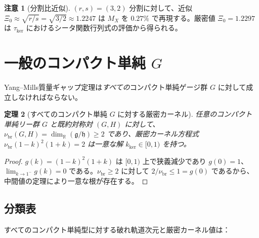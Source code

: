 \documentclass[12pt]{article}
\theoremstyle{plain}
\newtheorem{theorem}{定理}[section]
\theoremstyle{definition}
\newtheorem{remark}[theorem]{注意}
\numberwithin{equation}{section}
\newcommand{\R}{\mathbb{R}}
\newcommand{\fg}{\mathfrak{g}}
\newcommand{\fh}{\mathfrak{h}}
\newcommand{\br}{\mathrm{br}}
\newcommand{\kker}{\mathrm{ker}}
\begin{document}
\begin{remark}[分割比近似]
$(r,s)=(3,2)$ 分割に対して、近似 $\Xi_0\approx\sqrt{r/s}=\sqrt{3/2}\approx 1.2247$ は $M_X$ を $0.27\%$ で再現する。厳密値 $\Xi_0=1.2297$ は $\tau_{\kker}$ におけるシータ関数行列式の評価から得られる。
\end{remark}


\section{一般のコンパクト単純 $G$}\label{sec:generalG}

Yang--Mills質量ギャップ定理は\emph{すべての}コンパクト単純ゲージ群 $G$ に対して成立しなければならない。

\begin{theorem}[すべてのコンパクト単純 $G$ に対する厳密カーネル]\label{thm:generalkernel}
任意のコンパクト単純リー群 $G$ と既約対称対 $(G,H)$ に対して、$\nu_{\br}(G,H)=\dim_\R(\fg/\fh)\geq 2$ であり、厳密カーネル方程式 $\nu_{\br}(1-k)^2(1+k)=2$ は一意な解 $k_{\kker}\in[0,1)$ を持つ。
\end{theorem}

\begin{proof}
$g(k)=(1-k)^2(1+k)$ は $[0,1)$ 上で狭義減少であり $g(0)=1$、$\lim_{k\to 1^-}g(k)=0$ である。$\nu_{\br}\geq 2$ に対して $2/\nu_{\br}\leq 1=g(0)$ であるから、中間値の定理により一意な根が存在する。
\end{proof}

\subsection{分類表}

すべてのコンパクト単純型に対する破れ軌道次元と厳密カーネル値は：
\end{document}
